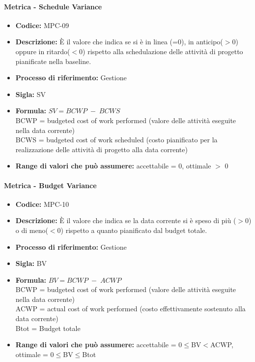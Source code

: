     \paragraph{Metrica - Schedule Variance}
    \begin{itemize}
        \item \textbf{Codice:} MPC-09
        \item \textbf{Descrizione:} È il valore che indica se si è in linea (=0), in anticipo($>$0) oppure in ritardo($<$0) rispetto alla schedulazione delle attività di progetto pianificate nella baseline.
        \item \textbf{Processo di riferimento:} Gestione
        \item \textbf{Sigla:} SV
        \item \textbf{Formula:} \begin{math}{SV = {BCWP \; - \; BCWS}}\end{math} \\BCWP = budgeted cost of work performed (valore delle attività eseguite nella data corrente) \\BCWS = budgeted cost of work scheduled (costo pianificato per la realizzazione delle attività di progetto alla data corrente)
        \item \textbf{Range di valori che può assumere:} accettabile = 0, ottimale $>$ 0
    \end{itemize}

    \paragraph{Metrica - Budget Variance}
        \begin{itemize}
            \item \textbf{Codice:} MPC-10 
            \item \textbf{Descrizione:} È il valore che indica se la data corrente si è speso di più ($>$0) o di meno($<$0) rispetto a quanto pianificato dal budget totale.
            \item \textbf{Processo di riferimento:} Gestione
            \item \textbf{Sigla:} BV
            \item \textbf{Formula:} \begin{math}{BV = {BCWP \; - \; ACWP}}\end{math} \\BCWP = budgeted cost of work performed (valore delle attività eseguite nella data corrente) \\ACWP = actual cost of work performed (costo effettivamente sostenuto alla data corrente) \\Btot = Budget totale
            \item \textbf{Range di valori che può assumere:} accettabile = 0$\leq$BV$<$ACWP, ottimale = 0$\leq$BV$\leq$Btot
        \end{itemize}

